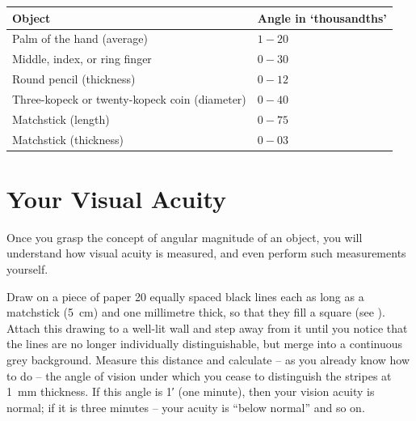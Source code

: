 \begin{small}
\begin{tabular}{p{5cm}p{1.75cm}}
\toprule
Object & Angle in `thousandths'\\
\midrule 
Palm of the hand (average) & $ 1-20$\\
Middle, index, or ring finger& $ 0-30$\\
Round pencil (thickness)& $0-12$\\
Three-kopeck or twenty-kopeck coin (diameter)&  $0-40$\\
Matchstick (length) & $0-75$\\
Matchstick (thickness) & $0-03$\\
\bottomrule
\end{tabular}
\end{small}


\section{Your Visual Acuity}
\label{sec-3.11}

Once you grasp the concept of angular magnitude of an object, you will understand how visual acuity is measured, and even perform such measurements yourself.

Draw on a piece of paper 20 equally spaced black lines each as long as a matchstick (\SI{5}{\centi\meter}) and one millimetre thick, so that they fill a square (see ). Attach this drawing to a well-lit wall and step away from it until you notice that the lines are no longer individually distinguishable, but merge into a continuous grey background. Measure this distance and calculate -- as you already know how to do -- the angle of vision under which you cease to distinguish the stripes at \SI{1}{\milli\meter} thickness. If this angle is \ang{;1} (one minute), then your vision acuity is normal; if it is three minutes -- your acuity is ``below normal'' and so on.


